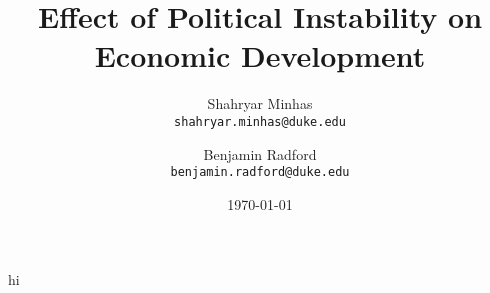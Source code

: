 \documentclass[12pt]{article}
\title{Effect of Political Instability on Economic Development}
\author{	Shahryar Minhas \\
	\texttt{shahryar.minhas@duke.edu}
	\and
	Benjamin Radford \\
	\texttt{benjamin.radford@duke.edu}}
\date{\today}
\begin{document}
\maketitle

\begin{abstract}
\singlespacing

\end{abstract}

\newpage










hi
\newpage


\end{document}
